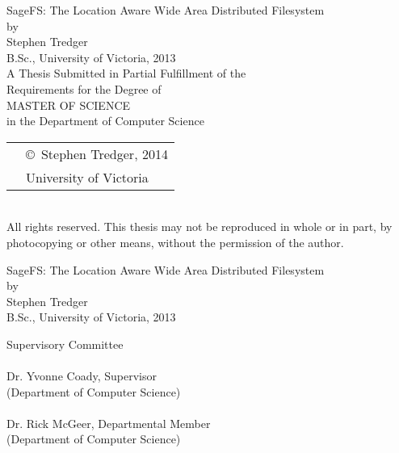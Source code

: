 \newcommand\thesistitle{SageFS: The Location Aware Wide Area Distributed Filesystem}
\newcommand\nameanddegrees{%
Stephen Tredger\\
B.Sc., University of Victoria, 2013}
\newcommand\panel{%
\HRule\\\panelist{Dr. Yvonne Coady}{Supervisor}{Department of Computer Science}
\HRule\\\panelist{Dr. Rick McGeer}{Departmental Member}{Department of Computer Science}}
\newcommand\tpbreak{\\[\baselineskip]}

\newpage
\thispagestyle{empty}

\pagestyle{myheadings}


%
%
\pagebreak
{
\centering
\thesistitle
\tpbreak
by
\tpbreak
\nameanddegrees
\tpbreak
A Thesis Submitted in Partial Fulfillment of the \\
Requirements for the Degree of
\tpbreak
MASTER OF SCIENCE
\tpbreak
in the Department of Computer Science\\
\vfill
\begin{tabular}{cl}
& \copyright\ Stephen Tredger, 2014\\
& \phantom{\copyright} University of Victoria
\end{tabular}
\tpbreak
All rights reserved. This thesis may not be reproduced in whole or in part, by \\
\hfill photocopying or other means, without the permission of the author. 
\hfill
}
\pagebreak

%
%
\newpage
{}

{
\centering
\thesistitle
\tpbreak
by
\tpbreak
\nameanddegrees
\tpbreak
}

\newcommand\panelist[3]{\noindent #1, #2\\\noindent(#3)\tpbreak}
\vfill
\noindent Supervisory Committee
\tpbreak
\panel
\vfill
\pagebreak

